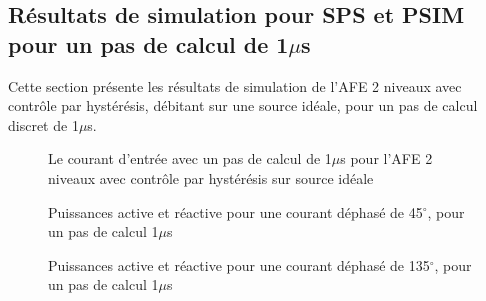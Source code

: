 \subsection{Résultats de simulation pour SPS et PSIM pour un pas de calcul de 1$\mu$s}
Cette section présente les résultats de simulation de l'AFE 2 niveaux avec contrôle par hystérésis, débitant sur une source idéale, pour un pas de calcul discret de 1$\mu$s. 


\begin{figure}[htb]
\caption{Le courant d'entrée avec un pas de calcul de 1$\mu$s pour l'AFE 2 niveaux avec contrôle par hystérésis sur source idéale}
\label{AF_I_cou}
\end{figure}



\begin{figure}[htb]
\caption{Puissances active et réactive pour une courant déphasé de 45$^\circ$, pour un pas de calcul 1$\mu$s}
\label{AF_I_pui_45}
\end{figure}

\begin{figure}[htb]
\caption{Puissances active et réactive pour une courant déphasé de 135$^\circ$, pour un pas de calcul 1$\mu$s}
\label{AF_I_pui_135}
\end{figure}

